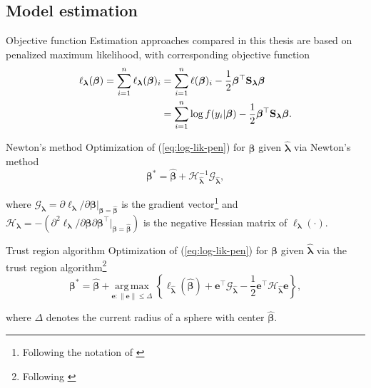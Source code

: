 \documentclass[xcolor=dvipsnames]{beamer}
\begin{document}
\subsection{Model estimation}
\begin{frame}{Objective function}
  Estimation approaches compared in this thesis are based on penalized maximum likelihood, with corresponding objective function
  \begin{equation}
    \begin{split}
      \ell_{\bm{\lambda}}(\bm{\beta}) = \displaystyle \sum_{i = 1}^n \ell_{\bm{\lambda}}(\bm{\beta})_i &=
      \sum_{i = 1}^n \ell(\bm{\beta})_i - \frac{1}{2} \bm{\beta}^\top \text{\textbf{S}}_{\bm{\lambda}} \bm{\beta} \\ &=
      \sum_{i = 1}^n \log f(y_i | \bm{\beta}) - \frac{1}{2} \bm{\beta}^\top \text{\textbf{S}}_{\bm{\lambda}} \bm{\beta}.
    \end{split}
    \label{eq:log-lik-pen}
  \end{equation}
\end{frame}

\begin{frame}{Newton's method}
  Optimization of (\ref{eq:log-lik-pen}) for $\bm{\beta}$ given $\hat{\bm{\lambda}}$ via Newton's method
  \begin{equation}
    \bm{\beta}^* = \hat{\bm{\beta}} + \bm{\mathcal{H}}_{\hat{\bm{\lambda}}}^{-1} \bm{\mathcal{G}}_{\hat{\bm{\lambda}}},
    \label{eq:newtons_method}
  \end{equation}

  where $\bm{\mathcal{G}}_{\bm{\lambda}} = \partial \ell_{\bm{\lambda}} / \partial \bm{\beta} |_{\bm{\beta} = \hat{\bm{\beta}}}$ is the gradient vector\footnote{Following the notation of \textcite{wood2016newton}} and $\bm{\mathcal{H}}_{\bm{\lambda}} = -(\partial^2 \ell_{\bm{\lambda}} / \partial \bm{\beta} \partial \bm{\beta}^\top |_{\bm{\beta} = \hat{\bm{\beta}}})$ is the negative Hessian matrix of $\ell_{\bm{\lambda}}(\cdot)$.
\end{frame}

\begin{frame}{Trust region algorithm}
  Optimization of (\ref{eq:log-lik-pen}) for $\bm{\beta}$ given $\hat{\bm{\lambda}}$ via the trust region algorithm\footnote{Following \textcite{aeberhard2021robust}}
  \begin{equation}
    \bm{\beta}^* = \hat{\bm{\beta}} + \underset{\bm{e}: \|\bm{e}\| \le \Delta}{\mathrm{arg\,max}} \;
    \left\{
    \ell_{\hat{\bm{\lambda}}}(\hat{\bm{\beta}}) + \bm{e}^\top \bm{\mathcal{G}}_{\hat{\bm{\lambda}}} - \frac{1}{2} \bm{e}^\top \bm{\mathcal{H}}_{\hat{\bm{\lambda}}} \bm{e}
    \right\},
    \label{eq:trust_region}
  \end{equation}

  where $\Delta$ denotes the current radius of a sphere with center $\hat{\bm{\beta}}$.
\end{frame}
\end{document}
